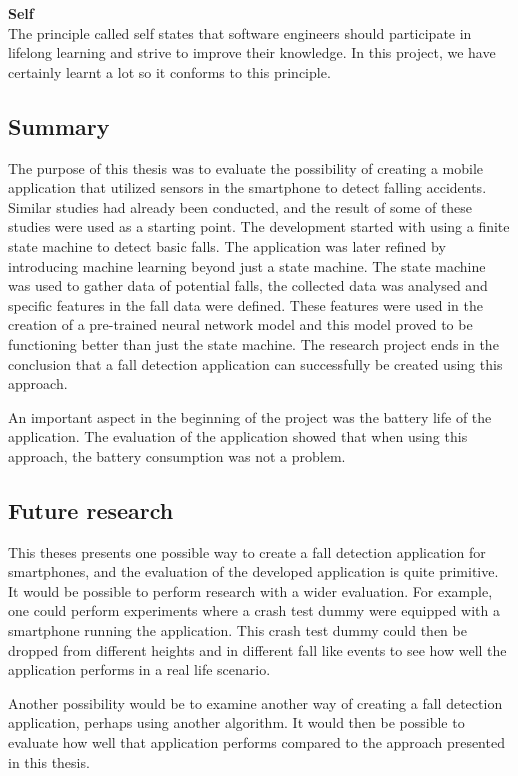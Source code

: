 \documentclass[12pt, a4paper, onecolumn]{article}
\newcommand{\parag}[1]{
	\textbf{#1} \hspace{0pt} \\
}
\begin{document}
	\parag{Self}
	The principle called self states that software engineers should participate in lifelong learning and strive to improve their knowledge. In this project, we have certainly learnt a lot so it conforms to this principle.
	
	\subsection{Summary}
	
	The purpose of this thesis was to evaluate the possibility of creating a mobile application that utilized sensors in the smartphone to detect falling accidents. Similar studies had already been conducted, and the result of some of these studies were used as a starting point. The development started with using a finite state machine to detect basic falls. The application was later refined by introducing machine learning beyond just a state machine. The state machine was used to gather data of potential falls, the collected data was analysed and specific features in the fall data were defined. These features were used in the creation of a pre-trained neural network model and this model proved to be functioning better than just the state machine. The research project ends in the conclusion that a fall detection application can successfully be created using this approach.
	
	An important aspect in the beginning of the project was the battery life of the application. The evaluation of the application showed that when using this approach, the battery consumption was not a problem.
	
	\subsection{Future research}
	
	This theses presents one possible way to create a fall detection application for smartphones, and the evaluation of the developed application is quite primitive. It would be possible to perform research with a wider evaluation. For example, one could perform experiments where a crash test dummy were equipped with a smartphone running the application. This crash test dummy could then be dropped from different heights and in different fall like events to see how well the application performs in a real life scenario.
	
	Another possibility would be to examine another way of creating a fall detection application, perhaps using another algorithm. It would then be possible to evaluate how well that application performs compared to the approach presented in this thesis.
	
	\newpage
		
	
	
\end{document}
